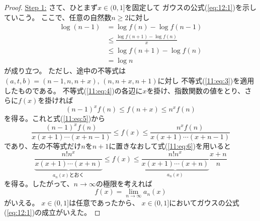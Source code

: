 \documentclass[report]{jlreq}
\begin{document}
\begin{proof}
    \underline{Step 1:}
    さて、ひとまず$x \in (0, 1]$を固定して
    ガウスの公式(\ref{eq:12:1})を示していこう。
    ここで、任意の自然数$n \ge 2$に対し
    \begin{equation}
        \begin{split}
            \log (n - 1)
                &= \log f(n) - \log f(n - 1) \\
                &\le \frac{\log f(n + 1) - \log f(n)}{x} \\
                &\le \log f(n + 1) - \log f(n) \\
                &= \log n
        \end{split}
        \label{11:eq:4}
    \end{equation}
    が成り立つ。
    ただし、途中の不等式は$(a, t, b) = (n - 1, n, n + x),\, (n, n + x, n + 1)$に対し
    不等式(\ref{11:eq:3})を適用したものである。
    不等式(\ref{11:eq:4})の各辺に$x$を掛け、指数関数の値をとり、さらに$f(x)$を掛ければ
    \begin{equation}
        (n - 1)^x f(n) \le f(n + x) \le n^x f(n)
    \end{equation}
    を得る。これと式(\ref{11:eq:5})から
    \begin{equation}
        \frac{(n - 1)^x f(n)}{x (x + 1) \cdots (x + n - 1)}
            \le f(x)
            \le \frac{n^x f(n)}{x (x + 1) \cdots (x + n - 1)}
    \end{equation}
    であり、左の不等式だけ$n$を$n + 1$に置きなおして式(\ref{11:eq:6})を用いると
    \begin{equation}
        \underbrace{\frac{n! n^x}{x (x + 1) \cdots (x + n)}}_{\text{$a_n(x)$とおく}}
            \le f(x)
            \le \underbrace{\frac{n! n^x}{x (x + 1) \cdots (x + n)}}_{a_n(x)} \frac{x + n}{n}
    \end{equation}
    を得る。したがって、$n \to \infty$の極限を考えれば
    \begin{equation}
        f(x) = \lim_{n \to \infty} a_n(x)
    \end{equation}
    がいえる。
    $x \in (0, 1]$は任意であったから、
    $x \in (0, 1]$においてガウスの公式(\ref{eq:12:1})の成立がいえた。


\end{proof}
\end{document}
